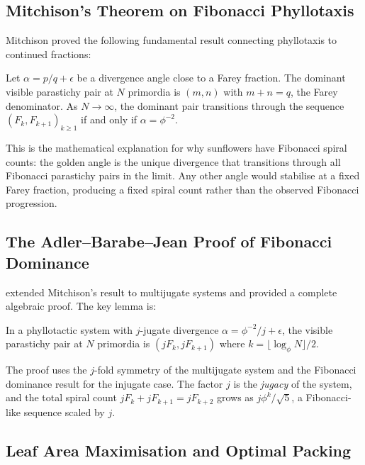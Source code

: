 \subsection{Mitchison's Theorem on Fibonacci Phyllotaxis}
\label{subsec:mitchison}

Mitchison \cite{mitchison1977phyllotaxis} proved the following
fundamental result connecting phyllotaxis to continued fractions:

\begin{theorem}[Mitchison, 1977]\label{thm:mitchison}
Let $\alpha = p/q + \epsilon$ be a divergence angle close to a Farey
fraction.  The dominant visible parastichy pair at $N$ primordia is
$(m, n)$ with $m + n = q$, the Farey denominator.  As $N \to \infty$,
the dominant pair transitions through the sequence
$(F_k, F_{k+1})_{k \geq 1}$ if and only if $\alpha = \phi^{-2}$.
\end{theorem}

This is the mathematical explanation for why sunflowers have Fibonacci
spiral counts: the golden angle is the unique divergence that
transitions through all Fibonacci parastichy pairs in the limit.  Any
other angle would stabilise at a fixed Farey fraction, producing a
fixed spiral count rather than the observed Fibonacci progression.

\subsection{The Adler–Barabe–Jean Proof of Fibonacci Dominance}
\label{subsec:abj-proof}

\cite{adler1997phyllotaxis} extended Mitchison's result to multijugate
systems and provided a complete algebraic proof.  The key lemma is:

\begin{lemma}\label{lem:abj}
In a phyllotactic system with $j$-jugate divergence
$\alpha = \phi^{-2}/j + \epsilon$, the visible parastichy pair at $N$
primordia is $(jF_k, jF_{k+1})$ where $k = \lfloor \log_\phi N \rfloor / 2$.
\end{lemma}

The proof uses the $j$-fold symmetry of the multijugate system and the
Fibonacci dominance result for the injugate case.  The factor $j$ is
the \emph{jugacy} of the system, and the total spiral count $jF_k +
jF_{k+1} = jF_{k+2}$ grows as $j\phi^k/\sqrt{5}$, a Fibonacci-like
sequence scaled by $j$.

\subsection{Leaf Area Maximisation and Optimal Packing}
\label{subsec:leaf-area}

